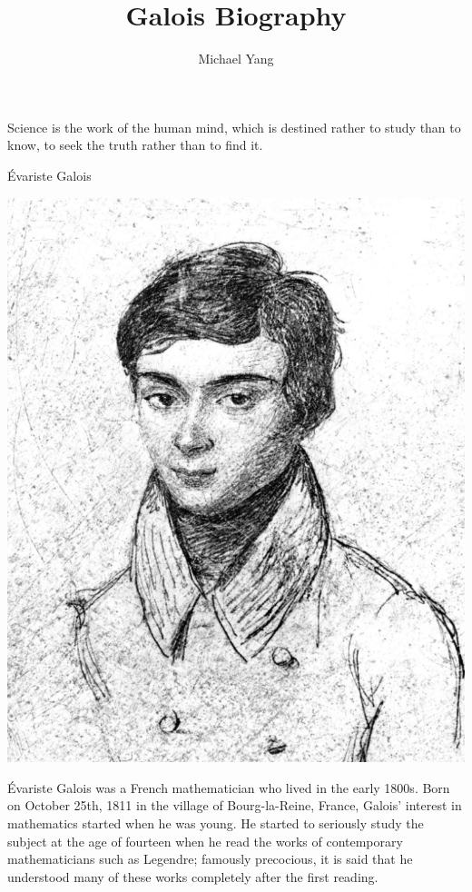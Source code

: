 \documentclass{article}
\title{Galois Biography}
\author{Michael Yang}
\begin{document}
\maketitle
\epigraph{Science is the work of the human mind, which is destined rather to study than to know, to seek the truth rather than to find it.}{Évariste Galois}

\begin{center}
    \includegraphics[scale=0.45]{images/galois.png}
\end{center}

Évariste Galois was a French mathematician who lived in the early 1800s. Born on October 25th, 1811 in the village of Bourg-la-Reine, France, Galois’ interest in mathematics started when he was young. He started to seriously study the subject at the age of fourteen when he read the works of contemporary mathematicians such as Legendre; famously precocious, it is said that he understood many of these works completely after the first reading. 
\end{document}
